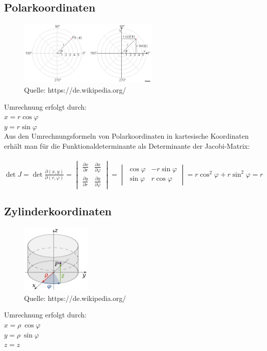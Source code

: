 \subsection{Polarkoordinaten}
\begin{figure}[h!]
\centering
    \includegraphics[width=0.6\textwidth]{images/Ebene_polarkoordinaten.PNG}
    \caption{Quelle: https://de.wikipedia.org/}
    
\end{figure}

Umrechnung erfolgt durch: \\
$x=r\cos\varphi$\\
$y=r\sin\varphi$\\

Aus den Umrechnungsformeln von Polarkoordinaten in kartesische Koordinaten erhält man für die Funktionaldeterminante als Determinante der Jacobi-Matrix:\\
\\$
\det J = \det\frac{\partial(x,y)}{\partial(r,\varphi)}
=\begin{vmatrix}
  \frac{\partial x}{\partial r} & \frac{\partial x}{\partial \varphi} \\
  \frac{\partial y}{\partial r} & \frac{\partial y}{\partial \varphi}
\end{vmatrix}
=\begin{vmatrix}
  \cos\varphi & -r\sin\varphi \\
  \sin\varphi &  r\cos\varphi
\end{vmatrix} =r\cos^2\varphi + r\sin^2\varphi = r
$

\subsection{Zylinderkoordinaten}
\begin{figure}[h!]
\centering
    \includegraphics[width=0.3\textwidth]{images/zylinderkoord.png}
    \caption{Quelle: https://de.wikipedia.org/}
    
\end{figure}
Umrechnung erfolgt durch: \\
$x=\rho\ \cos\varphi$\\
$y=\rho\ \sin\varphi$\\
$z=z$\\

